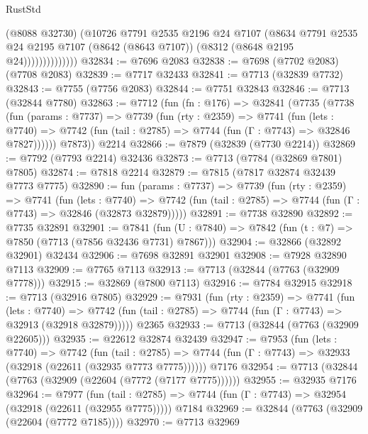 \begin{lexlean}{RustStd}
\begin{coremodule}
                        (@8088 @32730)
                        (@10726
                          @7791
                          @2535
                          @2196
                          @24
                          @7107
                          (@8634
                            @7791
                            @2535
                            @24
                            @2195
                            @7107
                            (@8642 (@8643 @7107))
                            (@8312 (@8648 @2195 @24))))))))))))))
@32834 := @7696 @2083
@32838 := @7698 (@7702 @2083) (@7708 @2083)
@32839 := @7717 @32433
@32841 := @7713 (@32839 @7732)
@32843 := @7755 (@7756 @2083)
@32844 := @7751 @32843
@32846 := @7713 (@32844 @7780)
@32863 := @7712
    (fun (fn : @176) =>
    @32841
      (@7735
        (@7738
          (fun (params : @7737) =>
          @7739
            (fun (rty : @2359) =>
            @7741
              (fun (lets : @7740) =>
              @7742 (fun (tail : @2785) => @7744 (fun (Γ : @7743) => @32846 @7827))))))
        @7873))
    @2214
@32866 := @7879 (@32839 (@7730 @2214))
@32869 := @7792 (@7793 @2214) @32436
@32873 := @7713 (@7784 (@32869 @7801) @7805)
@32874 := @7818 @2214
@32879 := @7815 (@7817 @32874 @32439 @7773 @7775)
@32890 := fun (params : @7737) =>
  @7739
    (fun (rty : @2359) =>
    @7741
      (fun (lets : @7740) =>
      @7742 (fun (tail : @2785) => @7744 (fun (Γ : @7743) => @32846 (@32873 @32879)))))
@32891 := @7738 @32890
@32892 := @7735 @32891
@32901 := @7841
    (fun (U : @7840) => @7842 (fun (t : @7) => @7850 (@7713 (@7856 @32436 @7731) @7867)))
@32904 := @32866 (@32892 @32901) @32434
@32906 := @7698 @32891 @32901
@32908 := @7928 @32890 @7113
@32909 := @7765 @7113
@32913 := @7713 (@32844 (@7763 (@32909 @7778)))
@32915 := @32869 (@7800 @7113)
@32916 := @7784 @32915
@32918 := @7713 (@32916 @7805)
@32929 := @7931
    (fun (rty : @2359) =>
    @7741
      (fun (lets : @7740) =>
      @7742 (fun (tail : @2785) => @7744 (fun (Γ : @7743) => @32913 (@32918 @32879)))))
    @2365
@32933 := @7713 (@32844 (@7763 (@32909 @22605)))
@32935 := @22612 @32874 @32439
@32947 := @7953
    (fun (lets : @7740) =>
    @7742
      (fun (tail : @2785) =>
      @7744 (fun (Γ : @7743) => @32933 (@32918 (@22611 (@32935 @7773 @7775))))))
    @7176
@32954 := @7713 (@32844 (@7763 (@32909 (@22604 (@7772 (@7177 @7775))))))
@32955 := @32935 @7176
@32964 := @7977
    (fun (tail : @2785) => @7744 (fun (Γ : @7743) => @32954 (@32918 (@22611 (@32955 @7775)))))
    @7184
@32969 := @32844 (@7763 (@32909 (@22604 (@7772 @7185))))
@32970 := @7713 @32969

\end{coremodule}
\end{lexlean}
